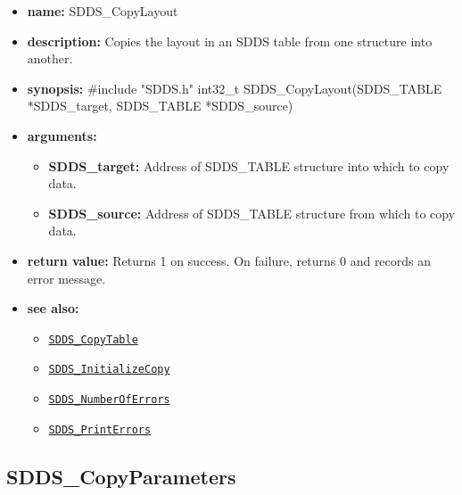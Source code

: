 \documentclass[11pt]{article}
\newcommand{\progref}[1]{\hyperref[SDDS_#1]{\tt SDDS\_#1}}
\begin{document}
\begin{itemize}
\item {\bf name:}\newline
SDDS\_CopyLayout
\item {\bf description:}\newline
Copies the layout in an SDDS table from one structure into another.
\item {\bf synopsis:} \#include "SDDS.h"\newline
int32\_t SDDS\_CopyLayout(SDDS\_TABLE *SDDS\_target, SDDS\_TABLE *SDDS\_source)
\item {\bf arguments:}
\begin{itemize}
\item {\bf SDDS\_target:} Address of SDDS\_TABLE structure into which to copy data.
\item {\bf SDDS\_source:} Address of SDDS\_TABLE structure from which to copy data.
\end{itemize}
\item {\bf return value:}\newline
Returns 1 on success. On failure, returns 0 and records an error message.
\item {\bf see also:}
\begin{itemize}
\item \progref{CopyTable}
\item \progref{InitializeCopy}
\item \progref{NumberOfErrors}
\item \progref{PrintErrors}
\end{itemize}
\end{itemize}

\subsection{SDDS\_CopyParameters}
\label{SDDS_CopyParameters}
\end{document}
